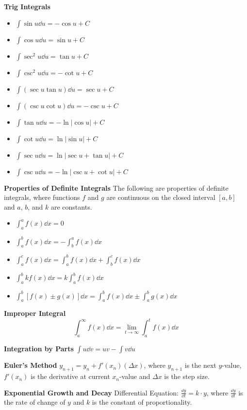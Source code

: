\documentclass[10pt,a4paper,oneside]{book}
\begin{document}
\textbf{Trig Integrals}
\begin{itemize}
    \item $\int \sin u \dd u = -\cos u +C$
    \item $\int \cos u \dd u = \sin u +C$
    \item $\int \sec^2 u \dd u = \tan u +C$
    \item $\int \csc^2 u \dd u = -\cot u +C$
    \item $\int (\sec u \tan u)\dd u = \sec u + C$
    \item $\int (\csc u \cot u)\dd u = -\csc u +C$
    \item $\int \tan u \dd u = -\ln|\cos u|+C$
    \item $\int \cot u \dd u = \ln|\sin u|+C$
    \item $\int \sec u \dd u = \ln|\sec u + \tan u|+C$
    \item $\int \csc u \dd u = -\ln|\csc u +\cot u|+C$
\end{itemize}

\textbf{Properties of Definite Integrals}
The following are properties of definite integrals, where functions $f$ and $g$ are continuous on the closed interval $[a,b]$ and $a$, $b$, and $k$ are constants.
\begin{itemize}
    \item $\int_a^a f(x)\dd x =0$
    \item $\int_a^b f(x)\dd x = -\int_b^a f(x)\dd x$
    \item $\int_a^c f(x)\dd x = \int_a^b f(x)\dd x+\int_b^c f(x)\dd x$
    \item $\int_a^b kf(x)\dd x = k\int_a^b f(x)\dd x$
    \item $\int_a^b [f(x)\pm g(x)]\dd x = \int_a^b f(x)\dd x\pm \int_a^b g(x)\dd x$
\end{itemize}

\textbf{Improper Integral}
\[ \int_a^{\infty}f(x)\dd x = \lim_{t\to\infty}\int_a^t f(x)\dd x \]

\textbf{Integration by Parts}
$\int u\dd v = uv-\int v\dd u$

\textbf{Euler's Method}
$y_{n+1}=y_n+f'(x_n)(\Delta x)$, where $y_{n+1}$ is the next $y$-value, $f'(x_n)$ is the derivative at current $x_n$-value and $\Delta x$ is the step size.

\textbf{Exponential Growth and Decay}
Differential Equation: $\frac{\dd y}{\dd t}=k\cdot y$, where $\frac{\dd y}{\dd t}$ is the rate of change of $y$ and $k$ is the constant of proportionality.
\end{document}
